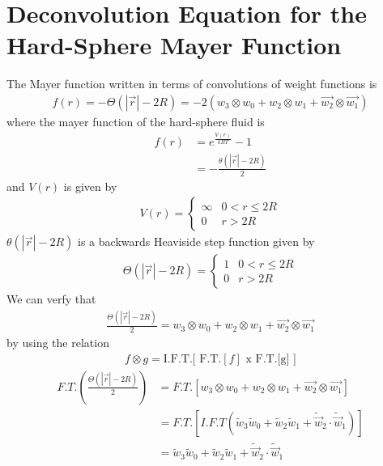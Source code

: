 \documentclass[double,12pt]{beavtex}
\begin{document}
\section{Deconvolution Equation for the Hard-Sphere Mayer Function} 

The Mayer function written in terms of convolutions of weight functions is
\begin{align}
    f(r)=-\Theta(|\vec{r}|-2R)= -2(w_3 \otimes w_0 + w_2 \otimes w_1 + \vec{w_2} \otimes \vec{w_1})  
\end{align}
where the mayer function of the hard-sphere fluid is 
\begin{align}
   f(r) &= e^{\frac{V(r)}{kBT}}-1 \\
        &= -\frac{\theta(|\vec r|-2R)}{2}
\end{align}
and $V(r)$ is given by
\begin{align}
    V(r)=\left\{ \begin{array}{rc} \infty & 0<r \leq 2R \\ 0  & r>2R \end{array}\right.
\end{align}
$\theta(|\vec r|-2R)$ is a backwards Heaviside step function 
given by 
\begin{align}
     \Theta(|\vec{r}|-2R)=\left\{ \begin{array}{rc} 1 & 0<r \leq 2R \\ 0  & r>2R \end{array}\right.
\end{align}
We can verfy that 
\begin{align}  \label{equation-to-verify}
     \frac{\Theta(|\vec{r}|-2R)}{2}= w_3 \otimes w_0 + w_2 \otimes w_1 + \vec{w_2} \otimes \vec{w_1}
\end{align}
by using the relation
\begin{align}
    f \otimes g = \text{I.F.T.[ F.T.}[f]\text{ x F.T.[g] }]
\end{align} 
\begin{align}\label{FTdecon}
    F.T.\left(\frac{\Theta(|\vec{r}|-2R)}{2}\right) 
        &= F.T.\left[w_3 \otimes w_0 + w_2 \otimes w_1 + \vec{w_2} \otimes \vec{w_1}\right]  \nonumber \\                                                  
        &= F.T.\left[I.F.T\left(\widetilde{w}_3\widetilde{w}_0 + \widetilde{w}_2\widetilde{w}_1 + \widetilde{\vec w}_2 \cdot \widetilde{\vec w}_1\right)\right]  \nonumber \\
        &= \widetilde{w}_3\widetilde{w}_0 + \widetilde{w}_2\widetilde{w}_1 + \widetilde{\vec w}_2 \cdot \widetilde{\vec w}_1 
\end{align}
\end{document}

